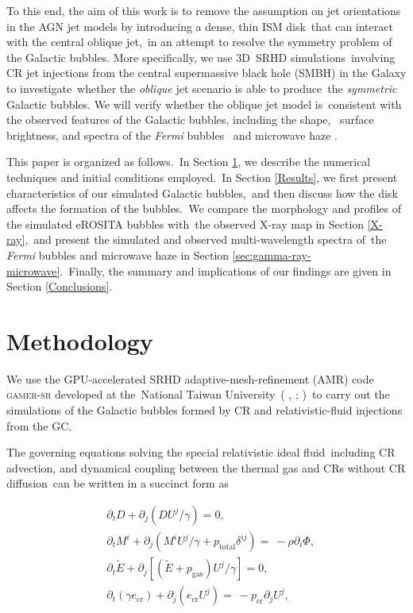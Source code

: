 \documentclass[fleqn,usenatbib,useAMS]{mnras}
\begin{document}
To this end, the aim of this work is to remove the assumption on jet orientations in the AGN jet models by introducing a dense, thin ISM disk\
that can interact with the central oblique jet,\
in an attempt to resolve the symmetry problem of the Galactic bubbles. More specifically, we use 3D\
SRHD simulations\
involving CR jet injections from the central supermassive black hole (SMBH) in the Galaxy to investigate\
whether the \textit{oblique} jet scenario is able to produce\
the \textit{symmetric} Galactic bubbles. We will verify whether the oblique jet model is\
consistent with the observed features of the Galactic bubbles, including the shape, \
surface brightness, and spectra of the \textit{Fermi} bubbles \citep{Ackermann2014}\
and microwave haze \citep{Dobler_2008,PlanckCollaborationIX2013}.

This paper is organized as follows.\
In Section \ref{Methodology}, we describe the numerical techniques and initial conditions employed.\
In Section \ref{Results}, we first present characteristics of our simulated Galactic bubbles,\
and then discuss how the disk affects the formation of the bubbles.\
We compare the morphology and profiles of the simulated eROSITA bubbles with\
the observed X-ray map in Section \ref{X-ray},\
and present the simulated and observed multi-wavelength spectra of\
the \textit{Fermi} bubbles and microwave haze in Section \ref{sec:gamma-ray-microwave}.\
Finally, the summary and implications of our findings are given in Section \ref{Conclusions}.

\section{Methodology}
\label{Methodology}
  We use the GPU-accelerated SRHD adaptive-mesh-refinement (AMR) code \textsc{gamer-sr} developed at the\
  National Taiwan University\
  (\citeauthor{gamer-1} \citeyear{gamer-1}, \citeyear{gamer-2}; \citeauthor{tseng2021} \citeyear{tseng2021})\
  to carry out the simulations of the Galactic bubbles formed by CR and relativistic-fluid injections from the GC.

  The governing equations solving the special relativistic ideal fluid\
  including CR advection, and dynamical coupling between the thermal gas and CRs without CR diffusion\
  can be written in a succinct form as


  \begin{subequations}
    \label{governing-eq}
    \begin{align}
     &\partial_{t} D+\partial_{j} \left(DU^{j}/\gamma\right)=0,\label{D evolution}\\
     &\partial_{t} M^{i}+\partial_{j} \left(M^{i}U^{j}/\gamma+p_{\text{total}}\delta^{ij}\right)=\
     -\rho\partial_{i}\Phi,\label{M evolution}\\
     &\partial_{t} \tilde{E}+\partial_j \left[\left(\tilde{E}+p_{\text{gas}}\right)U^{j}/\gamma\right]=0, \label{E evoltion}\\
     &\partial_{t} \left(\gamma e_{\text{cr}}\right) + \partial_{j} \left(e_{\text{cr}}U^{j}\right)=\
     -p_{\text{cr}} \partial_{j} U^{j},\label{E evolution}
    \end{align}
  \end{subequations}
\end{document}
